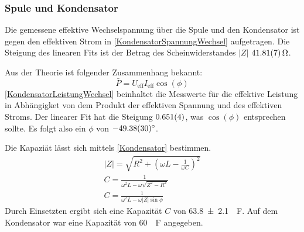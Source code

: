 \documentclass[
	a4paper,
	12pt,
	pagesize,
	ngerman
]{scrartcl}
\begin{document}
	\subsubsection*{Spule und Kondensator}
	Die gemessene effektive Wechselspannung über die Spule und den Kondensator ist gegen den effektiven Strom in \cref{KondensatorSpannungWechsel} aufgetragen.
	Die Steigung des linearen Fits ist der Betrag des Scheinwiderstandes $|Z|$ $\SI{41,81 \pm 0,07}{\Omega}$. 

	Aus der Theorie ist folgender Zusammenhang bekannt:
	\begin{equation}
		\bar{P} = U_\text{eff} I_\text{eff} \cos(\phi)
	\end{equation}
	\cref{KondensatorLeistungWechsel} beinhaltet die Messwerte für die effektive Leistung in Abhängigket von dem Produkt der effektiven Spannung und des effektiven Stroms. 
	Der linearer Fit hat die Steigung $\SI{0,651 \pm 0,004}{}$, was $\cos(\phi)$ entsprechen sollte. 
	Es folgt also ein $\phi$ von $-\ang{49,38 \pm 0,30}$.

	Die Kapaziät lässt sich mittels \cref{Kondensator} bestimmen.
	\begin{gather}
		\label{Kondensator}
		|Z| = \sqrt{R^2 + (\omega L - \frac{1}{\omega C})^2} \\
		C = \frac{1}{\omega^2 L- \omega\sqrt{Z^2-R^2}} \\
		C = \frac{1}{\omega^2 L- \omega|Z|\sin{\phi}} 
	\end{gather}
	Durch Einsetzten ergibt sich eine Kapazität $C$ von \SI{63,8 \pm 2,1}{\mu F}. Auf dem Kondensator war eine Kapazität von \SI{60}{\mu F} angegeben.
\end{document}
